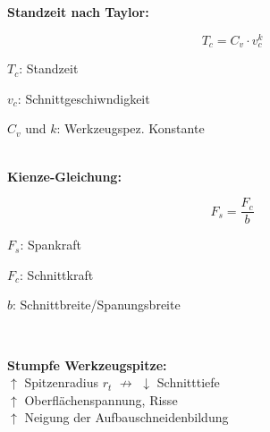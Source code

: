 \textbf{Standzeit nach Taylor:}\\
\begin{minipage}{0.5\linewidth}
    \[
    \boxed{     
        T_c = C_v \cdot v_c^k
    }
    \]
\end{minipage}
\begin{minipage}{0.5\linewidth}
    \begin{tiny}
    \item $T_c$: Standzeit
    \item $v_c$: Schnittgeschiwndigkeit
    \item $C_v$ und $k$: Werkzeugspez. Konstante
    \end{tiny}
\end{minipage}\\
\vspace{1mm}
\textbf{Kienze-Gleichung:}\\
\begin{minipage}{0.5\linewidth}
    \[
    \boxed{     
        F_s = \frac{F_c}{b}
    }
    \]
\end{minipage}
\begin{minipage}{0.5\linewidth}
    \begin{tiny}
    \item $F_s$: Spankraft
    \item $F_c$: Schnittkraft
    \item $b$: Schnittbreite/Spanungsbreite
    \end{tiny}
\end{minipage}\\
\vspace{1mm}

\textbf{Stumpfe Werkzeugspitze: }\\
$\uparrow$ Spitzenradius $r_t$ $\not\rightarrow$ $\downarrow$ Schnitttiefe\\
$\uparrow$ Oberflächenspannung, Risse\\
$\uparrow$ Neigung der Aufbauschneidenbildung


